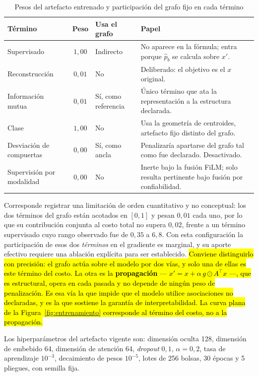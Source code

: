 \documentclass[11pt,a4paper]{article}
\newcommand{\nv}[1]{\hl{#1}}
\begin{document}
\begin{table}[H]
\centering
\caption{Pesos del artefacto entrenado y participación del grafo fijo en cada término}
\label{tab:terminos}
\small
\begin{tabularx}{\textwidth}{L{3.5cm} c L{2.4cm} X}
\toprule
\textbf{Término} & \textbf{Peso} & \textbf{Usa el grafo} & \textbf{Papel} \\
\midrule
Supervisado & $1{,}00$ & Indirecto & No aparece en la fórmula; entra porque $\hat{p}_b$ se calcula sobre $x'$. \\
Reconstrucción & $0{,}01$ & No & Deliberado: el objetivo es el $x$ original. \\
Información mutua & $0{,}01$ & Sí, como referencia & Único término que ata la representación a la estructura declarada. \\
Clase & $1{,}00$ & No & Usa la geometría de centroides, artefacto fijo distinto del grafo. \\
\addlinespace
Desviación de compuertas & $0{,}00$ & Sí, como ancla & Penalizaría apartarse del grafo tal como fue declarado. Desactivado. \\
Supervisión por modalidad & $0{,}00$ & No & Inerte bajo la fusión FiLM; solo resulta pertinente bajo fusión por confiabilidad. \\
\bottomrule
\end{tabularx}
\end{table}

Corresponde registrar una limitación de orden cuantitativo y no conceptual: los dos términos del
grafo están acotados en $[0,1]$ y pesan $0{,}01$ cada uno, por lo que su contribución conjunta
al costo total no supera $0{,}02$, frente a un término supervisado cuyo rango observado fue de
$0{,}35$ a $6{,}8$. Con esta configuración la participación de esos dos \emph{términos} en el
gradiente es marginal, y su aporte efectivo requiere una ablación explícita para ser
establecido. \nv{Conviene distinguirlo con precisión: el grafo actúa sobre el modelo por dos
vías, y solo una de ellas es este término del costo. La otra es la \textbf{propagación}
--- \mbox{$x' = x + \alpha\, g \odot A^{\top} x$} ---, que es estructural, opera en cada
pasada y no depende de ningún peso de penalización. Es esa vía la que impide que el modelo
utilice asociaciones no declaradas, y es la que sostiene la garantía de interpretabilidad. La
curva plana de la Figura~\mbox{\ref{fig:entrenamiento}} corresponde al término del costo, no a
la propagación.}

Los hiperparámetros del artefacto vigente son: dimensión oculta 128, dimensión de embebido 64,
dimensión de atención 64, \emph{dropout} $0{,}1$, $\alpha = 0{,}2$, tasa de aprendizaje
$10^{-3}$, decaimiento de pesos $10^{-5}$, lotes de 256 bolsas, 30 épocas y 5 pliegues, con
semilla fija.
\end{document}
